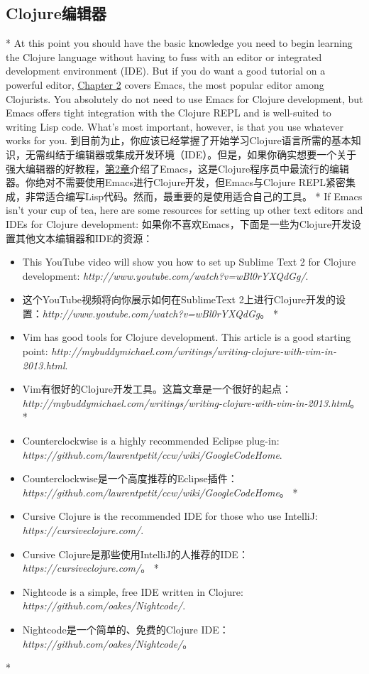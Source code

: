 \begin{paracol}{2}
\section{Clojure编辑器}
\switchcolumn[0]*
At this point you should have the basic knowledge you need to begin
learning the Clojure language without having to fuss with an editor or
integrated development environment (IDE). But if you do want a good
tutorial on a powerful editor, \href{javascript:void(0)}{Chapter 2}
covers Emacs, the most popular editor among Clojurists. You absolutely
do not need to use Emacs for Clojure development, but Emacs offers tight
integration with the Clojure REPL and is well-suited to writing Lisp
code. What's most important, however, is that you use whatever works for
you.
\switchcolumn
到目前为止，你应该已经掌握了开始学习Clojure语言所需的基本知识，无需纠结于编辑器或集成开发环境（IDE）。但是，如果你确实想要一个关于强大编辑器的好教程，\href{javascript:void(0)}{第2章}介绍了Emacs，这是Clojure程序员中最流行的编辑器。你绝对不需要使用Emacs进行Clojure开发，但Emacs与Clojure REPL紧密集成，非常适合编写Lisp代码。然而，最重要的是使用适合自己的工具。
\switchcolumn[0]*
If Emacs isn't your cup of tea, here are some resources for setting up
other text editors and IDEs for Clojure development:
\switchcolumn
如果你不喜欢Emacs，下面是一些为Clojure开发设置其他文本编辑器和IDE的资源：

\begin{itemize}
\switchcolumn[0]*
\item This YouTube video will show you how to set up Sublime Text 2 for
Clojure development: \emph{http://www.youtube.com/watch?v=wBl0rYXQdGg/}.
\switchcolumn
\item  这个YouTube视频将向你展示如何在SublimeText 2上进行Clojure开发的设置：\emph{http://www.youtube.com/watch?v=wBl0rYXQdGg}。
\switchcolumn[0]*
\item Vim has good tools for Clojure development. This article is a good
starting point:
\emph{http://mybuddymichael.com/writings/writing-clojure-with-vim-in-2013.html}.
\switchcolumn
\item Vim有很好的Clojure开发工具。这篇文章是一个很好的起点：\emph{http://mybuddymichael.com/writings/writing-clojure-with-vim-in-2013.html}。
\switchcolumn[0]*
\item Counterclockwise is a highly recommended Eclipse plug-in:
\emph{https://github.com/laurentpetit/ccw/wiki/GoogleCodeHome}.
\switchcolumn
\item Counterclockwise是一个高度推荐的Eclipse插件：\emph{https://github.com/laurentpetit/ccw/wiki/GoogleCodeHome}。
\switchcolumn[0]*
\item Cursive Clojure is the recommended IDE for those who use IntelliJ:
\emph{https://cursiveclojure.com/}.
\switchcolumn
\item Cursive Clojure是那些使用IntelliJ的人推荐的IDE：\emph{https://cursiveclojure.com/}。
\switchcolumn[0]*
\item Nightcode is a simple, free IDE written in Clojure:
\emph{https://github.com/oakes/Nightcode/}.
\switchcolumn
\item Nightcode是一个简单的、免费的Clojure IDE：\emph{https://github.com/oakes/Nightcode/}。
\end{itemize}
\switchcolumn[0]*

\end{paracol}
